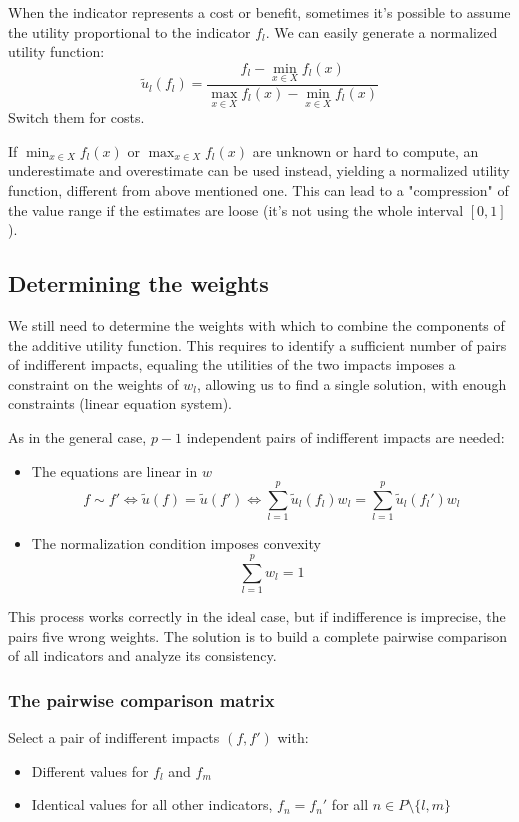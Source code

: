 When the indicator represents a cost or benefit, sometimes it's possible to assume the utility proportional to the indicator $f_l$. We can easily generate a normalized utility function:
$$ \tilde u_l (f_l) = \frac{f_l - \min_{x \in X} f_l (x)}{\max_{x \in X} f_l (x) - \min_{x \in X} f_l (x)} $$
Switch them for costs.

If $\min_{x \in X} f_l (x)$ or $\max_{x \in X} f_l (x)$ are unknown or hard to compute, an underestimate and overestimate can be used instead, yielding a normalized utility function, different from above mentioned one. This can lead to a "compression" of the value range if the estimates are loose (it's not using the whole interval $[0,1]$).

\subsection{Determining the weights}

We still need to determine the weights with which to combine the components of the additive utility function. This requires to identify a sufficient number of pairs of indifferent impacts, equaling the utilities of the two impacts imposes a constraint on the weights of $w_l$, allowing us to find a single solution, with enough constraints (linear equation system).

As in the general case, $p-1$ independent pairs of indifferent impacts are needed: 
\begin{itemize}
	\item The equations are linear in $w$ 
	$$ f \sim f' \Leftrightarrow \tilde u (f) = \tilde u (f') \Leftrightarrow \sum_{l = 1}^p \tilde u_l (f_l) w_l = \sum_{l = 1}^p \tilde u_l (f_l') w_l$$
	
	\item The normalization condition imposes convexity 
	$$ \sum_{l = 1}^p w_l = 1$$
\end{itemize}

This process works correctly in the ideal case, but if indifference is imprecise, the pairs five wrong weights. The solution is to build a complete pairwise comparison of all indicators and analyze its consistency.

\subsubsection{The pairwise comparison matrix}

Select a pair of indifferent impacts $(f, f')$ with:
\begin{itemize}
	\item Different values for $f_l$ and $f_m$
	
	\item Identical values for all other indicators, $f_n = f_n'$ for all $n \in P \setminus \{l, m\}$
\end{itemize}

